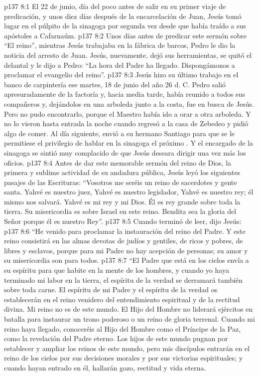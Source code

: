 \vs p137 8:1 El 22 de junio, día del  poco antes de salir en su primer viaje de predicación, y unos diez días después de la encarcelación de Juan, Jesús tomó lugar en el púlpito de la sinagoga por segunda vez desde que había traído a sus apóstoles a Cafarnaúm.
\vs p137 8:2 Unos días antes de predicar este sermón sobre “El reino”, mientras Jesús trabajaba en la fábrica de barcos, Pedro le dio la noticia del arresto de Juan. Jesús, nuevamente, dejó sus herramientas, se quitó el delantal y le dijo a Pedro: “La hora del Padre ha llegado. Dispongámonos a proclamar el evangelio del reino”.
\vs p137 8:3 Jesús hizo su último trabajo en el banco de carpintería ese martes, 18 de junio del año 26 d. C. Pedro salió apresuradamente de la factoría y, hacia media tarde, había reunido a todos sus compañeros y, dejándolos en una arboleda junto a la costa, fue en busca de Jesús. Pero no pudo encontrarlo, porque el Maestro había ido a orar a otra arboleda. Y no lo vieron hasta entrada la noche cuando regresó a la casa de Zebedeo y pidió algo de comer. Al día siguiente, envió a su hermano Santiago para que se le permitiese el privilegio de hablar en la sinagoga el próximo . Y el encargado de la sinagoga se sintió muy complacido de que Jesús deseara dirigir una vez más los oficios.
\vs p137 8:4 \pc Antes de dar este memorable sermón del reino de Dios, la primera y sublime actividad de su andadura pública, Jesús leyó los siguientes pasajes de las Escrituras: “Vosotros me seréis un reino de sacerdotes y gente santa. Yahvé es nuestro juez, Yahvé es nuestro legislador, Yahvé es nuestro rey; él mismo nos salvará. Yahvé es mi rey y mi Dios. Él es rey grande sobre toda la tierra. Su misericordia es sobre Israel en este reino. Bendita sea la gloria del Señor porque él es nuestro Rey”.
\vs p137 8:5 Cuando terminó de leer, dijo Jesús:
\vs p137 8:6 \pc “He venido para proclamar la instauración del reino del Padre. Y este reino consistirá en las almas devotas de judíos y gentiles, de ricos y pobres, de libres y esclavos, porque para mi Padre no hay acepción de personas; su amor y su misericordia son para todos.
\vs p137 8:7 “El Padre que está en los cielos envía a su espíritu para que habite en la mente de los hombres, y cuando yo haya terminado mi labor en la tierra, el espíritu de la verdad se derramará también sobre toda carne. El espíritu de mi Padre y el espíritu de la verdad os establecerán en el reino venidero del entendimiento espiritual y de la rectitud divina. Mi reino no es de este mundo. El Hijo del Hombre no liderará ejércitos en batalla para instaurar un trono poderoso o un reino de gloria terrenal. Cuando mi reino haya llegado, conoceréis al Hijo del Hombre como el Príncipe de la Paz, como la revelación del Padre eterno. Los hijos de este mundo pugnan por establecer y ampliar los reinos de este mundo, pero mis discípulos entrarán en el reino de los cielos por sus decisiones morales y por sus victorias espirituales; y cuando hayan entrado en él, hallarán gozo, rectitud y vida eterna.
